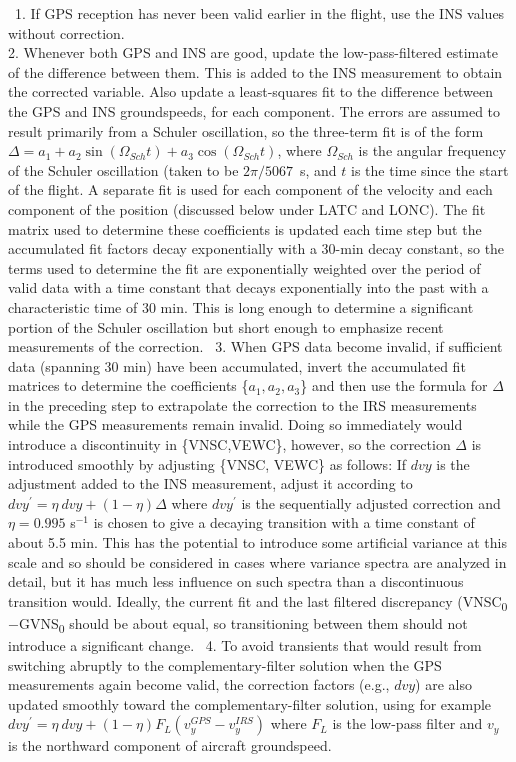 \documentclass[
  english,
]{book}
\begin{document}
~1. If GPS reception has never been valid earlier in the flight, use the INS values without correction.\\
\hspace*{0.333em}2. Whenever both GPS and INS are good, update the low-pass-filtered estimate of the difference between them. This is added to the INS measurement to obtain the corrected variable. Also update a least-squares fit to the difference between the GPS and INS groundspeeds, for each component. The errors are assumed to result primarily from a Schuler oscillation, so the three-term fit is of the form \(\Delta=a_1+a_2\sin(\Omega_{Sch}t)+a_3\cos(\Omega_{Sch}t)\), where \(\Omega_{Sch}\) is the angular frequency of the Schuler oscillation (taken to be \(2\pi/5067\)~s, and \(t\) is the time since the start of the flight. A separate fit is used for each component of the velocity and each component of the position (discussed below under LATC and LONC). The fit matrix used to determine these coefficients is updated each time step but the accumulated fit factors decay exponentially with a 30-min decay constant, so the terms used to determine the fit are exponentially weighted over the period of valid data with a time constant that decays exponentially into the past with a characteristic time of 30 min. This is long enough to determine a significant portion of the Schuler oscillation but short enough to emphasize recent measurements of the correction.
~3. When GPS data become invalid, if sufficient data (spanning 30 min) have been accumulated, invert the accumulated fit matrices to determine the coefficients \{\(a_1,a_2,a_3\)\} and then use the formula for \(\Delta\) in the preceding step to extrapolate the correction to the IRS measurements while the GPS measurements remain invalid. Doing so immediately would introduce a discontinuity in \{VNSC,VEWC\}, however, so the correction \(\Delta\) is introduced smoothly by adjusting \{VNSC, VEWC\} as follows: If \(dvy\) is the adjustment added to the INS measurement, adjust it according to
\(dvy^\prime=\eta\ dvy+(1-\eta)\Delta\) where \(dvy^\prime\) is the sequentially adjusted correction and \(\eta=0.995\) s\(^{-1}\) is chosen to give a decaying transition with a time constant of about 5.5 min. This has the potential to introduce some artificial variance at this scale and so should be considered in cases where variance spectra are analyzed in detail, but it has much less influence on such spectra than a discontinuous transition would. Ideally, the current fit and the last filtered discrepancy (VNSC\textsubscript{0}\(-\)GVNS\textsubscript{0} should be about equal, so transitioning between them should not introduce a significant change.
~4. To avoid transients that would result from switching abruptly to the complementary-filter solution when the GPS measurements again become valid, the correction factors (e.g., \(dvy\)) are also updated smoothly toward the complementary-filter solution, using for example \(dvy^\prime=\eta\ dvy+(1-\eta)F_L(v_y^{GPS}-v_y^{IRS})\) where \(F_L\) is the low-pass filter and \(v_y\) is the northward component of aircraft groundspeed.
\end{document}
